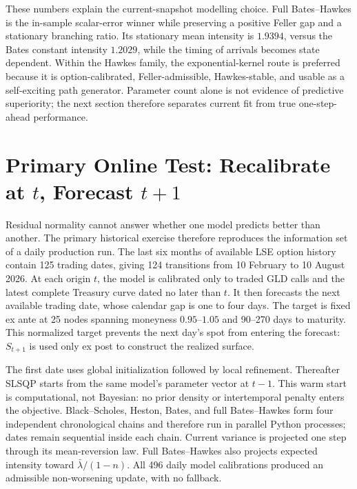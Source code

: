 \documentclass[a4paper,10pt,titlepage,oneside,openany]{book}
\theoremstyle{plain}
\theoremstyle{definition}
\theoremstyle{remark}
\begin{document}
These numbers explain the current-snapshot modelling choice. Full Bates--Hawkes is the in-sample scalar-error winner while preserving a positive Feller gap and a stationary branching ratio. Its stationary mean intensity is \(1.9394\), versus the Bates constant intensity \(1.2029\), while the timing of arrivals becomes state dependent. Within the Hawkes family, the exponential-kernel route is preferred because it is option-calibrated, Feller-admissible, Hawkes-stable, and usable as a self-exciting path generator. Parameter count alone is not evidence of predictive superiority; the next section therefore separates current fit from true one-step-ahead performance.


\section{Primary Online Test: Recalibrate at \texorpdfstring{\(t\)}{t}, Forecast \texorpdfstring{\(t+1\)}{t+1}}

Residual normality cannot answer whether one model predicts better than another. The primary historical exercise therefore reproduces the information set of a daily production run. The last six months of available LSE option history contain 125 trading dates, giving 124 transitions from 10 February to 10 August 2026. At each origin \(t\), the model is calibrated only to traded GLD calls and the latest complete Treasury curve dated no later than \(t\). It then forecasts the next available trading date, whose calendar gap is one to four days. The target is fixed ex ante at 25 nodes spanning moneyness \(0.95\)--\(1.05\) and 90--270 days to maturity. This normalized target prevents the next day's spot from entering the forecast: \(S_{t+1}\) is used only ex post to construct the realized surface.

The first date uses global initialization followed by local refinement. Thereafter SLSQP starts from the same model's parameter vector at \(t-1\). This warm start is computational, not Bayesian: no prior density or intertemporal penalty enters the objective. Black--Scholes, Heston, Bates, and full Bates--Hawkes form four independent chronological chains and therefore run in parallel Python processes; dates remain sequential inside each chain. Current variance is projected one step through its mean-reversion law. Full Bates--Hawkes also projects expected intensity toward \(\bar\lambda/(1-n)\). All 496 daily model calibrations produced an admissible non-worsening update, with no fallback.
\end{document}
